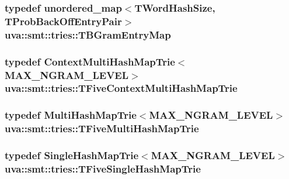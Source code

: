 \subsubsection[{T\+B\+Gram\+Entry\+Map}]{\setlength{\rightskip}{0pt plus 5cm}typedef unordered\+\_\+map$<${\bf T\+Word\+Hash\+Size}, {\bf T\+Prob\+Back\+Off\+Entry\+Pair}$>$ {\bf uva\+::smt\+::tries\+::\+T\+B\+Gram\+Entry\+Map}}\label{namespaceuva_1_1smt_1_1tries_a320b838ead9f4f7ce1ca28f18acef6ec}
\hypertarget{namespaceuva_1_1smt_1_1tries_a7ed391e3ba96f812885c5b45234b7a66}{}
\subsubsection[{T\+Five\+Context\+Multi\+Hash\+Map\+Trie}]{\setlength{\rightskip}{0pt plus 5cm}typedef {\bf Context\+Multi\+Hash\+Map\+Trie}$<${\bf M\+A\+X\+\_\+\+N\+G\+R\+A\+M\+\_\+\+L\+E\+V\+E\+L}$>$ {\bf uva\+::smt\+::tries\+::\+T\+Five\+Context\+Multi\+Hash\+Map\+Trie}}\label{namespaceuva_1_1smt_1_1tries_a7ed391e3ba96f812885c5b45234b7a66}
\hypertarget{namespaceuva_1_1smt_1_1tries_a0916c3aed3745b55a6ea956b697d0193}{}
\subsubsection[{T\+Five\+Multi\+Hash\+Map\+Trie}]{\setlength{\rightskip}{0pt plus 5cm}typedef {\bf Multi\+Hash\+Map\+Trie}$<${\bf M\+A\+X\+\_\+\+N\+G\+R\+A\+M\+\_\+\+L\+E\+V\+E\+L}$>$ {\bf uva\+::smt\+::tries\+::\+T\+Five\+Multi\+Hash\+Map\+Trie}}\label{namespaceuva_1_1smt_1_1tries_a0916c3aed3745b55a6ea956b697d0193}
\hypertarget{namespaceuva_1_1smt_1_1tries_a193f8f81788ff26920b4a93a34042d0b}{}
\subsubsection[{T\+Five\+Single\+Hash\+Map\+Trie}]{\setlength{\rightskip}{0pt plus 5cm}typedef {\bf Single\+Hash\+Map\+Trie}$<${\bf M\+A\+X\+\_\+\+N\+G\+R\+A\+M\+\_\+\+L\+E\+V\+E\+L}$>$ {\bf uva\+::smt\+::tries\+::\+T\+Five\+Single\+Hash\+Map\+Trie}}\label{namespaceuva_1_1smt_1_1tries_a193f8f81788ff26920b4a93a34042d0b}
\hypertarget{namespaceuva_1_1smt_1_1tries_a55e7eb3ceb4e902809786973cf89aa9c}{}
